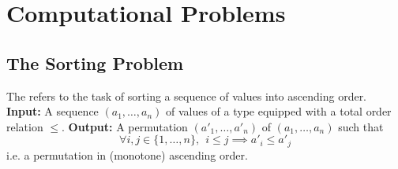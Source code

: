 \documentclass[11pt]{report}
\begin{document}
\section{Computational Problems}
\subsection{The Sorting Problem}

\begin{nproblem}
    The  refers to the task of sorting a sequence of values into ascending order.
    \mypar \textbf{Input:} A sequence $(a_1, \dots, a_n)$ of values of a type equipped with a total order relation $\leq$.
    \mypar \textbf{Output:} A permutation $(a'_1, \dots, a'_n)$ of $(a_1, \dots, a_n)$ such that 
    \[\forall i,j \in \{1,\dots,n \}, \ \  i \leq j \implies a'_i \leq a'_j  \]
    i.e. a permutation in (monotone) ascending order.
\end{nproblem}

\printindex
\end{document}
